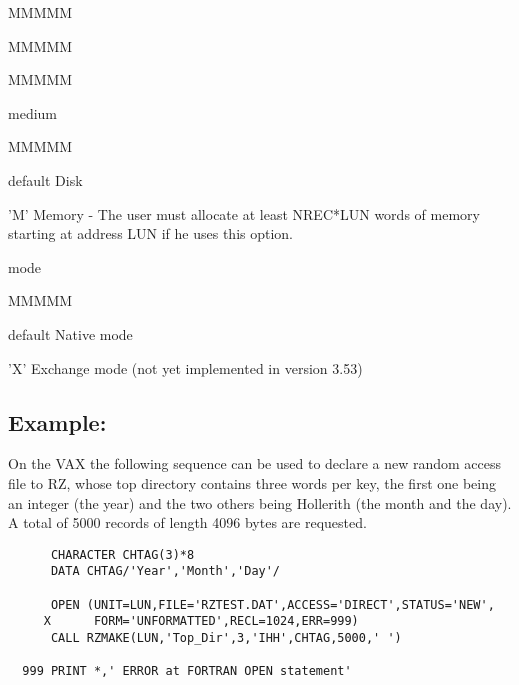 \begin{DL}{MMMMM}
\begin{DL}{MMMMM}
\begin{DL}{MMMMM}
\item[medium
]
\begin{DL}{MMMMM}
\item[default
]Disk
\item['M'
]Memory - The user must allocate at least NREC*LUN words
of memory starting at address LUN if he uses this option.
\end{DL}
\item[mode
]
\begin{DL}{MMMMM}
\item[default
]Native mode
\item['X'
]Exchange mode (not yet implemented in version 3.53)
\end{DL}
\end{DL}
\end{DL}
\end{DL}
\subsection{Example:}
\par On the VAX the following sequence can be used
to declare a new random access file to RZ, whose top directory contains
three words per key, the first one being an integer (the year) and the
two others being Hollerith (the month and the day).
A total of 5000 records of length 4096 bytes are requested.
\begin{verbatim}
      CHARACTER CHTAG(3)*8
      DATA CHTAG/'Year','Month','Day'/
 
      OPEN (UNIT=LUN,FILE='RZTEST.DAT',ACCESS='DIRECT',STATUS='NEW',
     X      FORM='UNFORMATTED',RECL=1024,ERR=999)
      CALL RZMAKE(LUN,'Top_Dir',3,'IHH',CHTAG,5000,' ')
 
  999 PRINT *,' ERROR at FORTRAN OPEN statement'
\end{verbatim}
